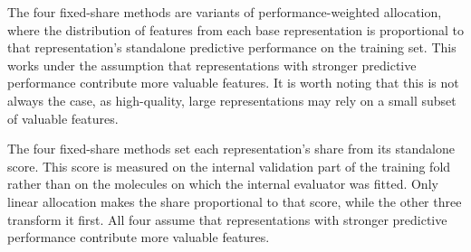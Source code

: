 


The four fixed-share methods are variants of performance-weighted allocation, where the distribution of features from each base representation is proportional to that representation's standalone predictive performance on the training set. This works under the assumption that representations with stronger predictive performance contribute more valuable features. It is worth noting that this is not always the case, as high-quality, large representations may rely on a small subset of valuable features.

The four fixed-share methods set each representation's share from its standalone score. This score is measured on the internal validation part of the training fold rather than on the molecules on which the internal evaluator was fitted. Only linear allocation makes the share proportional to that score, while the other three transform it first. All four assume that representations with stronger predictive performance contribute more valuable features.

